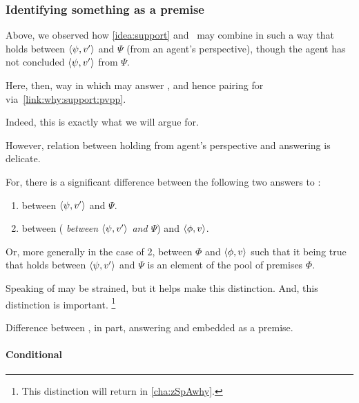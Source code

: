 \subsubsection{Identifying something as a premise}
\label{cha:clarification:sec:embedding}

\begin{note}
  Above, we observed how \autoref{idea:support} and~\supportII{} may combine in such a way that \support{} holds between \(\langle \psi, v' \rangle\) and \(\Psi\) (from an agent's perspective), though the agent has not concluded \(\langle \psi, v' \rangle\) from \(\Psi\).

  Here, then, way in which \support{} may answer \qWhyV{}, and hence pairing for \qWhy{} via~\autoref{link:why:support:pvpp}.

  Indeed, this is exactly what we will argue for.

  However, relation between \support{} holding from agent's perspective and \support{} answering \qWhyV{} is delicate.

  For, there is a significant difference between the following two answers to \qWhyV{}:
  \begin{enumerate}
  \item
     between \(\langle \psi, v' \rangle\) and \(\Psi\).
  \item
     between (\emph{\support{} between \(\langle \psi, v' \rangle\) and \(\Psi\)}) and \(\langle \phi, v \rangle\).
  \end{enumerate}
  Or, more generally in the case of 2, \support{} between \(\Phi\) and \(\langle \phi, v \rangle\) such that it being true that \support{} holds between \(\langle \psi, v' \rangle\) and \(\Psi\) is an element of the pool of premises \(\Phi\).

  Speaking of \support{} may be strained, but it helps make this distinction.
  And, this distinction is important.%
  \footnote{
    This distinction will return in \autoref{cha:zSpAwhy}.
  }

  Difference between \support{}, in part, answering \qWhyV{} and \support{} embedded as a premise.
\end{note}

\paragraph{Conditional}

